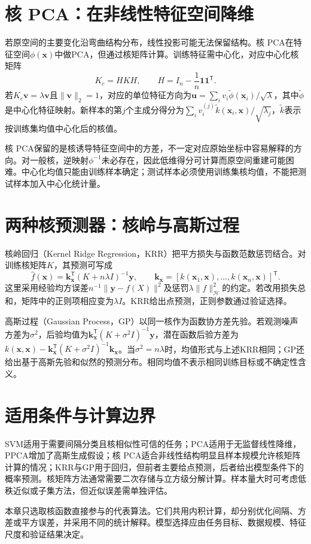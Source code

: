 \section{核 PCA：在非线性特征空间降维}
若原空间的主要变化沿弯曲结构分布，线性投影可能无法保留结构。核 PCA在特征空间$\phi(\bm x)$中做PCA，但通过核矩阵计算。训练特征需中心化，对应中心化核矩阵
\begin{equation}
 K_c=HKH,\qquad H=I_n-\frac1n\bm1\bm1^{\mathsf T}.
\end{equation}
若$K_c\bm v=\lambda\bm v$且$\|\bm v\|_2=1$，对应的单位特征方向为$\bm u=\sum_i v_i\tilde\phi(\bm x_i)/\sqrt{\lambda}$，其中$\tilde\phi$是中心化特征映射。新样本的第$j$个主成分得分为$\sum_i v_i^{(j)}\tilde k(\bm x_i,\bm x)/\sqrt{\lambda_j}$，$\tilde k$表示按训练集均值中心化后的核值。

核 PCA保留的是核诱导特征空间中的方差，不一定对应原始坐标中容易解释的方向。对一般核，逆映射$\phi^{-1}$未必存在，因此低维得分可计算而原空间重建可能困难。中心化均值只能由训练样本确定；测试样本必须使用训练集核均值，不能把测试样本加入中心化统计量。

\section{两种核预测器：核岭与高斯过程}
核岭回归（Kernel Ridge Regression，KRR）把平方损失与函数范数惩罚结合。对训练核矩阵$K$，其预测可写成
\begin{equation}
 \hat f(\bm x)=\bm k_{\bm x}^{\mathsf T}(K+n\lambda I)^{-1}\bm y,
 \qquad \bm k_{\bm x}=[k(\bm x_1,\bm x),\ldots,k(\bm x_n,\bm x)]^{\mathsf T}.
\end{equation}
这里采用经验均方误差$n^{-1}\|\bm y-f(X)\|^2$及惩罚$\lambda\|f\|_{\mathcal H}^2$的约定。若改用损失总和，矩阵中的正则项相应变为$\lambda I$。KRR给出点预测，正则参数通过验证选择。

高斯过程（Gaussian Process，GP）以同一核作为函数协方差先验。若观测噪声方差为$\sigma^2$，后验均值为$\bm k_{\bm x}^{\mathsf T}(K+\sigma^2I)^{-1}\bm y$，潜在函数后验方差为$k(\bm x,\bm x)-\bm k_{\bm x}^{\mathsf T}(K+\sigma^2I)^{-1}\bm k_{\bm x}$。当$\sigma^2=n\lambda$时，均值形式与上述KRR相同；GP还给出基于高斯先验和似然的预测分布。相同均值不表示相同训练目标或不确定性含义。

\section{适用条件与计算边界}
SVM适用于需要间隔分类且核相似性可信的任务；PCA适用于无监督线性降维，PPCA增加了高斯生成假设；核 PCA适合非线性结构明显且样本规模允许核矩阵计算的情况；KRR与GP用于回归，但前者主要给点预测，后者给出模型条件下的概率预测。核矩阵方法通常需要二次存储与立方级分解计算。样本量大时可考虑低秩近似或子集方法，但近似误差需单独评估。

本章只选取核函数直接参与的代表算法。它们共用内积计算，却分别优化间隔、方差或平方误差，并采用不同的统计解释。模型选择应由任务目标、数据规模、特征尺度和验证结果决定。

